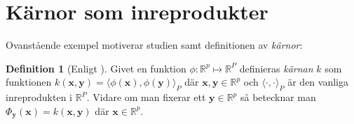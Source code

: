 \documentclass[a4paper, 12pt]{report}
\theoremstyle{definition}
\newtheorem{defi}{Definition}[section]
\theoremstyle{remark}
\newcommand{\bfx}{\mathbf{x}}
\newcommand{\bfy}{\mathbf{y}}
\begin{document}



\section{Kärnor som inreprodukter}

Ovanstående exempel motiverar studien samt definitionen av \emph{kärnor}:
\begin{defi}[Enligt \cite{LearningKernels}]\label{def:kärna}
	Givet en funktion $\phi: \mathbb{R}^p \longmapsto \mathbb{R}^P$ definieras \emph{kärnan} $k$ som funktionen $k\left(\bfx, \bfy\right) = \langle \phi \left(\bfx\right), \phi\left(\bfy\right) \rangle_P$ där $\bfx, \bfy \in \mathbb{R}^p$ och $\langle \cdot, \cdot \rangle_P$ är den vanliga inreprodukten i $\mathbb{R}^P$.
	Vidare om man fixerar ett $\bfy\in\mathbb{R}^p$ så betecknar man $\Phi_{\bfy}\left(\bfx\right) = k\left(\bfx, \bfy\right)$ där $\bfx\in\mathbb{R}^p$.
\end{defi}
\end{document}
